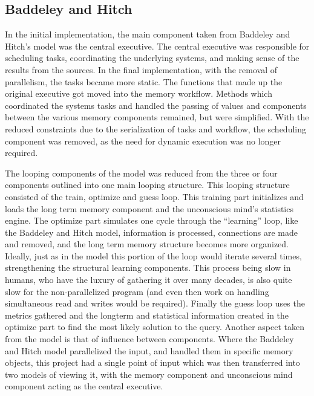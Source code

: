 \subsection{Baddeley and Hitch}

In the initial implementation, the main component taken from Baddeley and
Hitch's model was the central executive.  The central executive was responsible
for scheduling tasks, coordinating the underlying systems, and making sense of
the results from the sources.  In the final implementation, with the removal of
parallelism, the tasks became more static.  The functions that made up the
original executive got moved into the memory workflow.  Methods which
coordinated the systems tasks and handled the passing of values and components
between the various memory components remained, but were simplified.  With the
reduced constraints due to the serialization of tasks and workflow, the
scheduling component was removed, as the need for dynamic execution was no
longer required.

The looping components of the model was reduced from the three or four
components outlined into one main looping structure.  This looping structure
consisted of the train, optimize and guess loop.  This training part initializes
and loads the long term memory component and the unconscious mind's statistics
engine.  The optimize part simulates one cycle through the ``learning'' loop,
like the Baddeley and Hitch model, information is processed, connections are
made and removed, and the long term memory structure becomes more organized.
Ideally, just as in the model this portion of the loop would iterate several
times, strengthening the structural learning components. This process being slow
in humans, who have the luxury of gathering it over many decades, is also quite
slow for the non-parallelized program (and even then work on handling
simultaneous read and writes would be required). Finally the guess loop uses the
metrics gathered and the longterm and statistical information created in the
optimize part to find the most likely solution to the query. Another aspect
taken from the model is that of influence between components.  Where the
Baddeley and Hitch model parallelized the input, and handled them in specific
memory objects, this project had a single point of input which was then
transferred into two models of viewing it, with the memory component and
unconscious mind component acting as the central executive.


